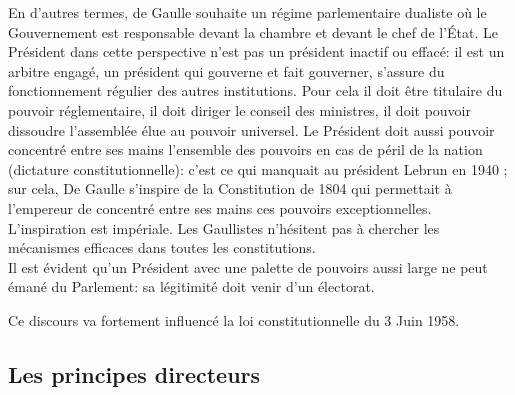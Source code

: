 \documentclass[12pt, a4paper, openany]{book}
\begin{document}
En d'autres termes, de Gaulle souhaite un régime parlementaire dualiste où le Gouvernement est responsable devant la chambre et devant le chef de l'État. Le Président dans cette perspective n'est pas un président inactif ou effacé: il est un arbitre engagé, un président qui gouverne et fait gouverner, s'assure du fonctionnement régulier des autres institutions. Pour cela il doit être titulaire du pouvoir réglementaire, il doit diriger le conseil des ministres, il doit pouvoir dissoudre l'assemblée élue au pouvoir universel. Le Président doit aussi pouvoir concentré entre ses mains l'ensemble des pouvoirs en cas de péril de la nation (dictature constitutionnelle): c'est ce qui manquait au président Lebrun en 1940 ; sur cela, De Gaulle s'inspire de la Constitution de 1804 qui permettait à l'empereur de concentré entre ses mains ces pouvoirs exceptionnelles. L'inspiration est impériale. Les Gaullistes n'hésitent pas à chercher les mécanismes efficaces dans toutes les constitutions. \\
Il est évident qu'un Président avec une palette de pouvoirs aussi large ne peut émané du Parlement: sa légitimité doit venir d'un électorat. 


Ce discours va fortement influencé la loi constitutionnelle du 3 Juin 1958.

\subsection{Les principes directeurs}
\end{document}
